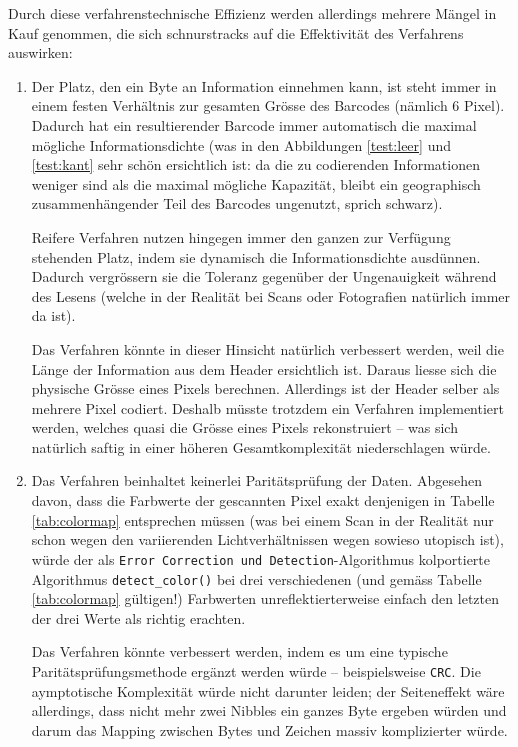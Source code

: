 \documentclass[11pt]{scrreprt} %
\theoremstyle{definition}
\begin{document}
Durch diese verfahrenstechnische Effizienz werden allerdings mehrere Mängel in Kauf genommen, die sich schnurstracks auf die Effektivität des Verfahrens auswirken:

\begin{enumerate}
\item Der Platz, den ein Byte an Information einnehmen kann, ist steht immer in einem festen Verhältnis zur gesamten Grösse des Barcodes (nämlich 6 Pixel). Dadurch hat ein resultierender Barcode immer automatisch die maximal mögliche Informationsdichte (was in den Abbildungen \ref{test:leer} und \ref{test:kant} sehr schön ersichtlich ist: da die zu codierenden Informationen weniger sind als die maximal mögliche Kapazität, bleibt ein geographisch zusammenhängender Teil des Barcodes ungenutzt, sprich schwarz).

Reifere Verfahren nutzen hingegen immer den ganzen zur Verfügung stehenden Platz, indem sie dynamisch die Informationsdichte ausdünnen. Dadurch vergrössern sie die Toleranz gegenüber der Ungenauigkeit während des Lesens (welche in der Realität bei Scans oder Fotografien natürlich immer da ist).

Das Verfahren könnte in dieser Hinsicht natürlich verbessert werden, weil die Länge der Information aus dem Header ersichtlich ist. Daraus liesse sich die physische Grösse eines Pixels berechnen. Allerdings ist der Header selber als mehrere Pixel codiert. Deshalb müsste trotzdem ein Verfahren implementiert werden, welches quasi die Grösse eines Pixels rekonstruiert -- was sich natürlich saftig in einer höheren Gesamtkomplexität niederschlagen würde.

\item Das Verfahren beinhaltet keinerlei Paritätsprüfung der Daten. Abgesehen davon, dass die Farbwerte der gescannten Pixel exakt denjenigen in Tabelle \ref{tab:colormap} entsprechen müssen (was bei einem Scan in der Realität nur schon wegen den variierenden Lichtverhältnissen wegen sowieso utopisch ist), würde der als {\tt Error Correction und Detection}-Algorithmus \cite{paper} kolportierte Algorithmus {\tt detect\_color()} bei drei verschiedenen (und gemäss Tabelle \ref{tab:colormap} gültigen!) Farbwerten unreflektierterweise einfach den letzten der drei Werte als richtig erachten.

Das Verfahren könnte verbessert werden, indem es um eine typische Paritätsprüfungsmethode ergänzt werden würde -- beispielsweise {\tt CRC}. Die aymptotische Komplexität würde nicht darunter leiden; der Seiteneffekt wäre allerdings, dass nicht mehr zwei Nibbles ein ganzes Byte ergeben würden und darum das Mapping zwischen Bytes und Zeichen massiv komplizierter würde.

\end{enumerate}
\end{document}
